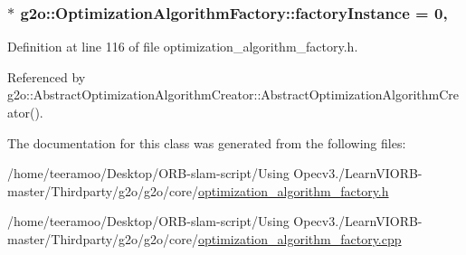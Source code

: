 \subsubsection[{\texorpdfstring{factory\+Instance}{factoryInstance}}]{ $\ast$ g2o\+::\+Optimization\+Algorithm\+Factory\+::factory\+Instance = 0\hspace{0.3cm}{\ttfamily [static]}, {\ttfamily [private]}}\hypertarget{classg2o_1_1OptimizationAlgorithmFactory_a688a34932a4e4c94e122dd81f35bb7ca}{}\label{classg2o_1_1OptimizationAlgorithmFactory_a688a34932a4e4c94e122dd81f35bb7ca}


Definition at line 116 of file optimization\+\_\+algorithm\+\_\+factory.\+h.



Referenced by g2o\+::\+Abstract\+Optimization\+Algorithm\+Creator\+::\+Abstract\+Optimization\+Algorithm\+Creator().



The documentation for this class was generated from the following files\+:\begin{DoxyCompactItemize}
\item 
/home/teeramoo/\+Desktop/\+O\+R\+B-\/slam-\/script/\+Using Opecv3./\+Learn\+V\+I\+O\+R\+B-\/master/\+Thirdparty/g2o/g2o/core/\hyperlink{optimization__algorithm__factory_8h}{optimization\+\_\+algorithm\+\_\+factory.\+h}\item 
/home/teeramoo/\+Desktop/\+O\+R\+B-\/slam-\/script/\+Using Opecv3./\+Learn\+V\+I\+O\+R\+B-\/master/\+Thirdparty/g2o/g2o/core/\hyperlink{optimization__algorithm__factory_8cpp}{optimization\+\_\+algorithm\+\_\+factory.\+cpp}\end{DoxyCompactItemize}

